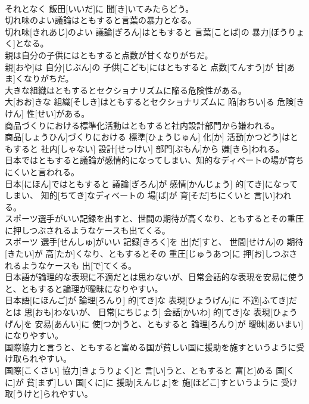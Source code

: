 \documentclass[8pt]{extreport}
\begin{document}
\begin{CJK}{UTF8}{min}
\\	それとなく 飯田[いいだ]に 聞[き]いてみたらどう。
\\	切れ味のよい議論はともすると言葉の暴力となる。	
\\	切れ味[きれあじ]のよい 議論[ぎろん]はともすると 言葉[ことば]の 暴力[ぼうりょく]となる。
\\	親は自分の子供にはともすると点数が甘くなりがちだ。	
\\	親[おや]は 自分[じぶん]の 子供[こども]にはともすると 点数[てんすう]が 甘[あま]くなりがちだ。
\\	大きな組織はともするとセクショナリズムに陥る危険性がある。	
\\	大[おお]きな 組織[そしき]はともするとセクショナリズムに 陥[おちい]る 危険[きけん] 性[せい]がある。
\\	商品づくりにおける標準化活動はともすると社内設計部門から嫌われる。	
\\	商品[しょうひん]づくりにおける 標準[ひょうじゅん] 化[か] 活動[かつどう]はともすると 社内[しゃない] 設計[せっけい] 部門[ぶもん]から 嫌[きら]われる。
\\	日本ではともすると議論が感情的になってしまい、知的なディベートの場が育ちにくいと言われる。	
\\	日本[にほん]ではともすると 議論[ぎろん]が 感情[かんじょう] 的[てき]になってしまい、 知的[ちてき]なディベートの 場[ば]が 育[そだ]ちにくいと 言[い]われる。
\\	スポーツ選手がいい記録を出すと、世間の期待が高くなり、ともするとその重圧に押しつぶされるようなケースも出てくる。	
\\	スポーツ 選手[せんしゅ]がいい 記録[きろく]を 出[だ]すと、 世間[せけん]の 期待[きたい]が 高[たか]くなり、ともするとその 重圧[じゅうあつ]に 押[お]しつぶされるようなケースも 出[で]てくる。
\\	日本語が論理的な表現に不適だとは思わないが、日常会話的な表現を安易に使うと、ともすると論理が曖昧になりやすい。	
\\	日本語[にほんご]が 論理[ろんり] 的[てき]な 表現[ひょうげん]に 不適[ふてき]だとは 思[おも]わないが、 日常[にちじょう] 会話[かいわ] 的[てき]な 表現[ひょうげん]を 安易[あんい]に 使[つか]うと、ともすると 論理[ろんり]が 曖昧[あいまい]になりやすい。
\\	国際協力と言うと、ともすると富める国が貧しい国に援助を施すというように受け取られやすい。	
\\	国際[こくさい] 協力[きょうりょく]と 言[い]うと、ともすると 富[と]める 国[くに]が 貧[まず]しい 国[くに]に 援助[えんじょ]を 施[ほどこ]すというように 受け取[うけと]られやすい。

\end{CJK}
\end{document}
